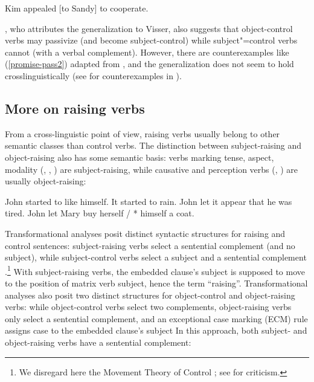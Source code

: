 \begin{exe}
\ex Kim appealed [to Sandy] to cooperate. \label{to}
\end{exe}


 
\citet[]{Bresnan1982}, who attributes the generalization to Visser, also suggests that
object-control verbs may passivize (and become subject-control) while subject"=control verbs cannot
(with a verbal complement). However, there are counterexamples like (\ref{promise-pass2}) adapted
from \citet[]{JB1976a-u}, and the generalization does not seem to hold crosslinguistically
(see \citealt[]{Mueller2002b} for counterexamples in ).

\eal
{}\label{persuade-pass}
\label{promise-pass}
\label{promise-pass2}
\zl

 
\subsection{More on raising verbs}
\label{sec-more-on-raising-verbs}

From a cross-linguistic point of view, raising verbs usually belong to other semantic classes than
control verbs. The distinction between subject-raising and object-raising also has some semantic
basis: verbs marking tense, aspect, modality (, , ) are
subject-raising, while causative and perception verbs (, ) are usually
object-raising:

\eal
\ex John started to like himself.
\ex It started to rain.
\ex John let it appear that he was tired.
\ex John let Mary buy herself / * himself a coat.
\zl
	

Transformational analyses posit distinct syntactic structures for raising and control sentences:
subject-raising verbs select a sentential complement (and no subject), while subject-control verbs
select a subject and a sentential complement \parencites[\iaddpages]{Postal1974}[\iaddpages]{Chomsky81a}.\footnote{We disregard here the Movement Theory of Control \citep{Hornstein99a-u}; see  for criticism.}
With subject-raising
verbs, the embedded clause's subject is supposed to move to the position of matrix verb subject,
hence the  term ``raising''. Transformational analyses also posit two distinct structures for object-control and
object-raising verbs: while object-control verbs select two complements, object-raising verbs only
select a sentential complement, and an exceptional case marking (ECM) rule assigns case to the
embedded clause's subject%
In this approach, both subject- and object-raising verbs have a sentential complement:
	
